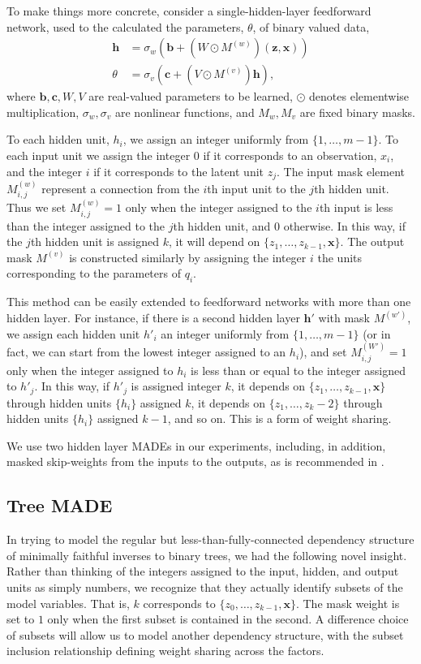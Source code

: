 \documentclass{article}
\begin{document}
To make things more concrete, consider a single-hidden-layer feedforward network, used to the calculated the parameters, $\theta$, of binary valued data,
\begin{align*}
	\mathbf{h} &= \sigma_w\left(\mathbf{b} + (W\odot M^{(w)})(\mathbf{z},\mathbf{x})\right)\\
	\theta &= \sigma_v\left(\mathbf{c} + (V\odot M^{(v)})\mathbf{h}\right),
\end{align*}
where $\mathbf{b},\mathbf{c},W,V$ are real-valued parameters to be learned, $\odot$ denotes elementwise multiplication, $\sigma_w,\sigma_v$ are nonlinear functions, and $M_w,M_v$ are fixed binary masks.

To each hidden unit, $h_i$, we assign an integer uniformly from $\{1,\ldots,m-1\}$.
To each input unit we assign the integer $0$ if it corresponds to an observation, $x_i$, and the integer $i$ if it corresponds to the latent unit $z_j$.
The input mask element $M^{(w)}_{i,j}$ represent a connection from the $i$th input unit to the $j$th hidden unit.
Thus we set $M^{(w)}_{i,j}=1$ only when the integer assigned to the $i$th input is less than the integer assigned to the $j$th hidden unit, and $0$ otherwise. In this way, if the $j$th hidden unit is assigned $k$, it will depend on $\{z_1,\ldots,z_{k-1}, \mathbf{x}\}$.
The output mask $M^{(v)}$ is constructed similarly by assigning the integer $i$ the units corresponding to the parameters of $q_i$.

This method can be easily extended to feedforward networks with more than one hidden layer.
For instance, if there is a second hidden layer $\mathbf{h}'$ with mask $M^{(w')}$, we assign each hidden unit $h'_i$ an integer uniformly from $\{1,\ldots,m-1\}$ (or in fact, we can start from the lowest integer assigned to an $h_i$), and set $M^{(W')}_{i,j}=1$ only when the integer assigned to $h_i$ is less than or equal to the integer assigned to $h'_j$.
In this way, if $h'_j$ is assigned integer $k$, it depends on $\{z_1,\ldots,z_{k-1},\mathbf{x}\}$ through hidden units $\{h_i\}$ assigned $k$, it depends on $\{z_1,\ldots,z_k-2\}$ through hidden units $\{h_i\}$ assigned $k-1$, and so on.
This is a form of weight sharing.

We use two hidden layer MADEs in our experiments, including, in addition, masked skip-weights from the inputs to the outputs, as is recommended in \citet{GermainEtAl2015}.

\subsection{Tree MADE}
In trying to model the regular but less-than-fully-connected dependency structure of minimally faithful inverses to binary trees, we had the following novel insight.
Rather than thinking of the integers assigned to the input, hidden, and output units as simply numbers, we recognize that they actually identify subsets of the model variables.
That is, $k$ corresponds to $\{z_0,\ldots,z_{k-1},\mathbf{x}\}$.
The mask weight is set to $1$ only when the first subset is contained in the second.
A difference choice of subsets will allow us to model another dependency structure, with the subset inclusion relationship defining weight sharing across the factors.
\end{document}

